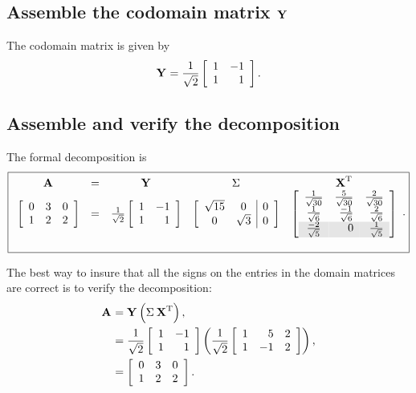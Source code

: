 \subsection{Assemble the codomain matrix $\Y{}$}
The codomain matrix is given by
\begin{equation}
  \Y{} = \frac{1}{\sqrt{2}}
  \mat{rr}{1 & -1\\1 & 1}.
\end{equation}

\subsection{Assemble and verify the decomposition}
The formal decomposition is
\begin{equation}
  \boxed{
  \begin{array}{ccccc}
    \A{} &=& \Y{} & \sig{} & \X{T}\\
  \mat{ccc}
  {
  0 & 3 & 0 \\
  1 & 2 & 2
  } 
  &=&
  \frac{1}{\sqrt{2}}
  \mat{rr}{1 & -1\\1 & 1}
  &
  \mat{cc|c}
  {
  \sqrt{15} & 0 & 0 \\
  0 & \sqrt{3}  & 0
  }
  &
  \mat{ crr }
 {\frac{1}{\sqrt{30}} & \frac{5}{\sqrt{30}} & \frac{2}{\sqrt{30}}\\
  \frac{ 1}{\sqrt{6}} & \frac{-1}{\sqrt{6}} & \frac{2}{\sqrt{6}} \\
  \rowcolor{ltgray}
  \frac{-2}{\sqrt{5}} & 0 & \frac{1}{\sqrt{5}}}\\[25pt]
  \end{array}.
  }
  \label{eq:general:ysxt}
\end{equation}

The best way to insure that all the signs on the entries in the domain matrices are correct is to verify the decomposition:
\begin{equation}
  \begin{split}
    \A{} &= \Y{}\paren{\sig{}\,\X{T}},\\
     &=
  \stwo
  \mat{rr}{1 & -1\\1 & 1}
  \paren{
  \stwo
  \mat{crc}
  {
  1 & 5  & 2 \\
  1 & -1 & 2
  }}, \\
  &=
  \mat{ccc}
  {
  0 & 3 & 0 \\
  1 & 2 & 2
  }.
  \end{split}
  \label{eq:gen:soln}
\end{equation}

\endinput